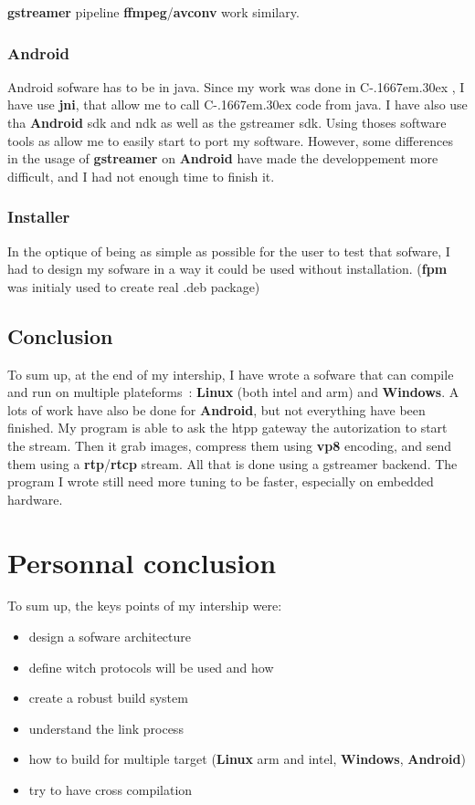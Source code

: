 \documentclass[a4paper,11pt]{custom}
\newcommand{\rtp}{\textbf{rtp}}
\newcommand{\rtcp}{\textbf{rtcp}}
\newcommand{\avconv}{\textbf{avconv}}
\newcommand{\ffmpeg}{\textbf{ffmpeg}}
\newcommand{\gstreamer}{\textbf{gstreamer}}
\newcommand{\vpx}{\textbf{vp8}}
\newcommand{\jni}{\textbf{jni}}
\newcommand{\fpm}{\textbf{fpm}}
\newcommand{\linux}{\textbf{Linux}}
\newcommand{\win}{\textbf{Windows}}
\newcommand{\android}{\textbf{Android}}
\newcommand{\cpp}{%
  C\kern-.1667em\raise.30ex\hbox{\smaller{++}}%
  \spacefactor1000%
}
\begin{document}
\gstreamer{} pipeline
\ffmpeg/\avconv{} work similary.

\subsection{Android}

Android sofware has to be in java. Since my work was done in \cpp, I have use
\jni, that allow me to call \cpp code from java. I have also use tha \android{}
sdk and ndk as well as the gstreamer sdk. Using thoses software tools as allow
me to easily start to port my software. However, some differences in the usage
of \gstreamer{} on \android{} have made the developpement more difficult, and I
had not enough time to finish it.

\subsection{Installer}

In the optique of being as simple as possible for the user to test that sofware,
I had to design my sofware in a way it could be used without installation.
(\fpm{} was initialy used to create real .deb package)

\section{Conclusion}

To sum up, at the end of my intership, I have wrote a sofware that can compile
and run on multiple plateforms~: \linux{} (both intel and arm) and \win. A lots
of work have also be done for \android, but not everything have been finished.
My program is able to ask the htpp gateway the autorization to start the stream.
Then it grab images, compress them using \vpx{} encoding, and send them using a
\rtp{}/\rtcp{} stream. All that is done using a gstreamer backend. The program I
wrote still need more tuning to be faster, especially on embedded hardware.

\chapter{Personnal conclusion}

To sum up, the keys points of my intership were:
\begin{multicols}{2}
\begin{itemize}
\item design a sofware architecture
\item define witch protocols will be used and how
\item create a robust build system
\item understand the link process
\item how to build for multiple target (\linux{} arm and intel, \win, \android)
\item try to have cross compilation
\end{itemize}
\end{multicols}
\end{document}
